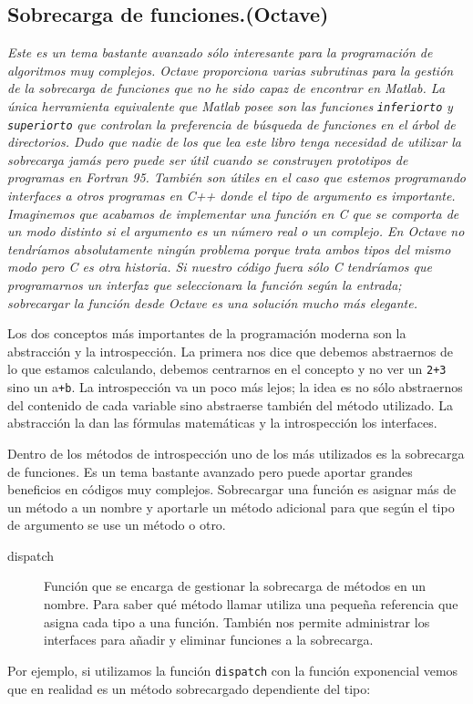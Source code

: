 \subsection{Sobrecarga de funciones.(Octave)}

\emph{Este es un tema bastante avanzado sólo interesante para la
  programación de algoritmos muy complejos. Octave proporciona varias
  subrutinas para la gestión de la sobrecarga de funciones que no he
  sido capaz de encontrar en Matlab. La única herramienta equivalente
  que Matlab posee son las funciones} \texttt{\emph{inferiorto}}
\emph{y} \texttt{\emph{superiorto}} \emph{que controlan la preferencia
  de búsqueda de funciones en el árbol de directorios. Dudo que nadie
  de los que lea este libro tenga necesidad de utilizar la sobrecarga
  jamás pero puede ser útil cuando se construyen prototipos de
  programas en Fortran 95. También son útiles en el caso que estemos
  programando interfaces a otros programas en C++ donde el tipo de
  argumento es importante. Imaginemos que acabamos de implementar una
  función en C que se comporta de un modo distinto si el argumento es
  un número real o un complejo. En Octave no tendríamos absolutamente
  ningún problema porque trata ambos tipos del mismo modo pero C es
  otra historia. Si nuestro código fuera sólo C tendríamos que
  programarnos un interfaz que seleccionara la función según la
  entrada; sobrecargar la función desde Octave es una solución mucho
  más elegante.}

Los dos conceptos más importantes de la programación moderna son la
abstracción y la introspección. La primera nos dice que debemos
abstraernos de lo que estamos calculando, debemos centrarnos en el
concepto y no ver un \texttt{2+3} sino un a\texttt{+b}. La
introspección va un poco más lejos; la idea es no sólo abstraernos del
contenido de cada variable sino abstraerse también del método
utilizado. La abstracción la dan las fórmulas matemáticas y la
introspección los interfaces.

Dentro de los métodos de introspección uno de los más utilizados es la
sobrecarga de funciones. Es un tema bastante avanzado pero puede
aportar grandes beneficios en códigos muy complejos. Sobrecargar una
función es asignar más de un método a un nombre y aportarle un método
adicional para que según el tipo de argumento se use un método o otro.

\begin{description}
\item [dispatch]Función que se encarga de gestionar la
  sobrecarga de métodos en un nombre. Para saber qué método llamar
  utiliza una pequeña referencia que asigna cada tipo a una función.
  También nos permite administrar los interfaces para añadir y
  eliminar funciones a la sobrecarga.
\end{description}
Por ejemplo, si utilizamos la función \texttt{dispatch} con la función
exponencial vemos que en realidad es un método sobrecargado
dependiente del tipo:

